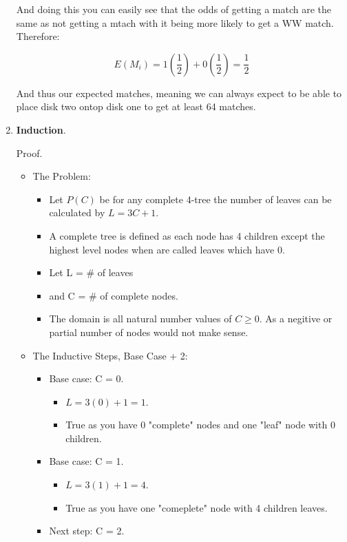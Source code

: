 \documentclass{article}
\begin{document}
\begin{enumerate}
    And doing this you can easily see that the odds of getting a match are the same as not getting a mtach with it being more likely to get a WW match. Therefore:

    \[E(M_i) = 1(\frac{1}{2}) + 0(\frac{1}{2}) = \frac{1}{2}\]

    And thus our expected matches,  meaning we can always expect to be able to place disk two ontop disk one to get at least 64 matches.

    \item \textbf{Induction}.
    
    Proof.
    
    \begin{itemize}
      \item The Problem:
      \begin{itemize}
        \item Let $P(C)$ be for any complete 4-tree the number of leaves can be calculated by $L = 3C + 1$.
        \item A complete tree is defined as each node has 4 children except the highest level nodes when are called leaves which have 0. 
        \item Let L = \# of leaves
        \item and C = \# of complete nodes.
        \item The domain is all natural number values of $C \geq 0$. As a negitive or partial number of nodes would not make sense.
      \end{itemize}
      \item The Inductive Steps, Base Case + 2:
      \begin{itemize}
        \item Base case: C = 0.
        \begin{itemize}
          \item $L = 3(0) + 1 = 1$. 
          \item True as you have 0 "complete" nodes and one "leaf" node with 0 children.          
        \end{itemize}
        \item Base case: C = 1.
        \begin{itemize}
          \item $L = 3(1) + 1 = 4$. 
          \item True as you have one "comeplete" node with 4 children leaves.          
        \end{itemize}
        \item Next step: C = 2.

\end{itemize}
\end{itemize}
\end{enumerate}
\end{document}
